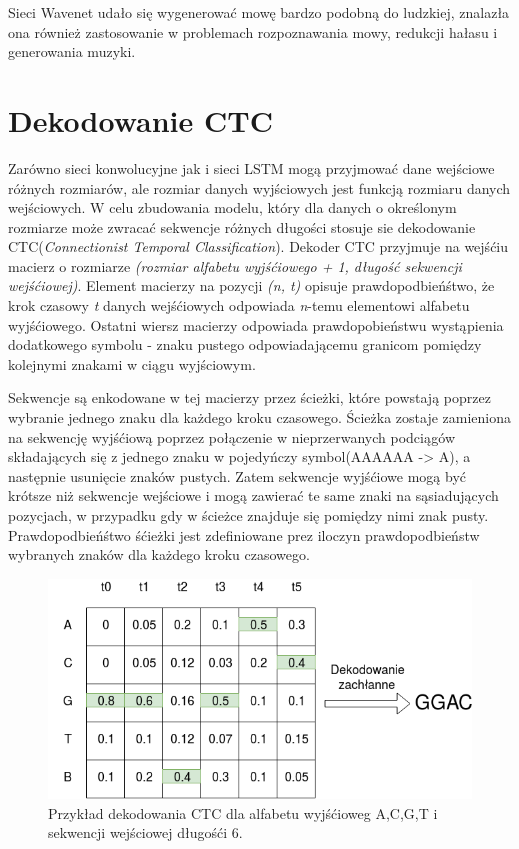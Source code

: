 \documentclass[a4paper,11pt,twoside]{report}
\theoremstyle{definition}
\begin{document}
Sieci Wavenet udało się wygenerować mowę bardzo podobną do ludzkiej\cite{wavenet}, znalazła ona również zastosowanie w problemach rozpoznawania mowy, redukcji hałasu i generowania muzyki\cite{wavenetReview}.

\section*{Dekodowanie CTC}

Zarówno sieci konwolucyjne jak i sieci LSTM mogą przyjmować dane wejściowe różnych rozmiarów, ale rozmiar danych wyjściowych jest funkcją rozmiaru danych wejściowych. W celu zbudowania modelu, który dla danych o określonym rozmiarze może zwracać sekwencje różnych długości stosuje sie dekodowanie CTC(\textit{Connectionist Temporal Classification})\cite{ctc}. Dekoder CTC przyjmuje na wejśćiu macierz o rozmiarze \textit{(rozmiar alfabetu wyjśćiowego + 1, długość sekwencji wejśćiowej)}. Element macierzy na pozycji  \textit{(n, t)} opisuje prawdopodbieńśtwo, że krok czasowy \textit{t} danych wejśćiowych odpowiada \textit{n}-temu elementowi alfabetu wyjśćiowego. Ostatni wiersz macierzy odpowiada prawdopobieństwu wystąpienia dodatkowego symbolu - znaku pustego odpowiadającemu granicom pomiędzy kolejnymi znakami w ciągu wyjściowym. 

Sekwencje są enkodowane w tej macierzy przez ścieżki, które powstają poprzez wybranie jednego znaku dla każdego kroku czasowego. Ścieżka zostaje zamieniona na sekwencję wyjśćiową poprzez połączenie w nieprzerwanych podciągów składających się z jednego znaku w pojedyńczy symbol(AAAAAA -> A), a następnie usunięcie znaków pustych. Zatem sekwencje wyjśćiowe mogą być krótsze niż sekwencje wejściowe i mogą zawierać te same znaki na sąsiadujących pozycjach, w przypadku gdy w ścieżce znajduje się pomiędzy nimi znak pusty. Prawdopodbieńśtwo śćieżki jest zdefiniowane prez iloczyn prawdopodbieństw wybranych znaków dla każdego kroku czasowego.

\begin{figure}[h!]
	\centering
	\includegraphics[scale=0.8]{ctc_array}
	\caption{Przykład dekodowania CTC dla alfabetu wyjśćioweg {A,C,G,T} i sekwencji wejściowej długośći 6.}
\end{figure}
\end{document}
